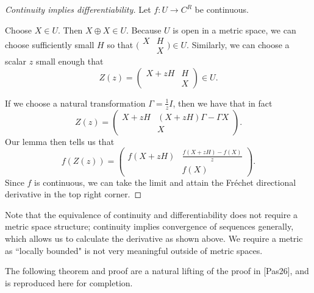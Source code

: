 \documentclass[12pt]{amsart}
\theoremstyle{definition}
\numberwithin{equation}{section}
\newcommand{\m}[1]{\bigl(\begin{smallmatrix}#1\end{smallmatrix}\bigr)}
\newcommand{\M}[1]{\begin{pmatrix}#1\end{pmatrix}}
\begin{document}
\begin{proof}[Continuity implies differentiability]
    Let $f: U \rightarrow C^R$ be continuous. 

    Choose $X \in U$. Then $X \oplus X\in U$. Because $U$ is open in a metric space, we can choose sufficiently small $H$ so that $\m{X & H\\&X} \in U$. Similarly, we can choose a scalar $z$ small enough that \[Z(z) = \M{X +zH & H\\& X} \in U.\]

    If we choose a natural transformation $\Gamma = \frac{1}{z} I$, then we have that in fact \[Z(z) = \M{X+zH & (X +zH)\Gamma - \Gamma X \\& X}.\]
    Our lemma then tells us that \[f(Z(z)) = \M{f(X+zH) & \frac{f(X+zH)-f(X)}{z} \\& f(X)}.\]
    Since $f$ is continuous, we can take the limit and attain the Fr\'echet directional derivative in the top right corner.

\end{proof}


Note that the equivalence of continuity and differentiability does not require a metric space structure; continuity implies convergence of sequences generally, which allows us to calculate the derivative as shown above. We require a metric as ``locally bounded" is not very meaningful outside of metric spaces. 

The following theorem and proof are a natural lifting of the proof in [Pas26], and is reproduced here for completion. 
\end{document}

